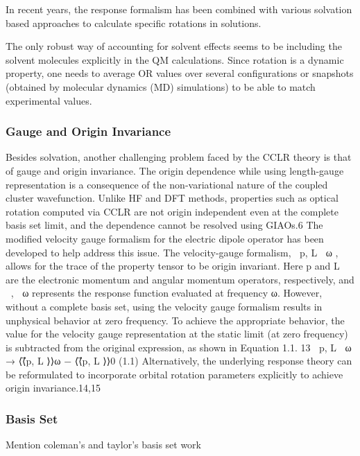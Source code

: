In recent years, the response formalism has been combined with various solvation based
approaches\cite{Neugebauer05,Neugebauer09,Mennucci02,Tomasi05,JensenGordon96}
to calculate specific rotations in solutions. 


The only robust way of accounting for solvent effects seems to be including the solvent molecules explicitly 
in the QM calculations. Since rotation is a dynamic property, one needs to average OR values over several 
configurations or snapshots (obtained by molecular dynamics (MD) simulations) to be able to match experimental 
values. 

\subsubsection{Gauge and Origin Invariance}
Besides solvation, another challenging problem faced by the CCLR theory is that of 
gauge and origin invariance.
The origin dependence while using length-gauge representation is a consequence of the non-variational nature of the 
coupled cluster wavefunction. Unlike HF and DFT methods, properties such as optical rotation computed via CCLR 
are not origin independent even at the complete basis set limit, and the dependence cannot be resolved using GIAOs.6 
The modified velocity gauge formalism for the electric dipole operator has been developed to help address this 
issue. The velocity-gauge formalism, ⟨⟨⃗p, L⃗ ⟩⟩ω , allows for the trace of the property tensor to be origin 
invariant. Here ⃗p and L⃗ are the electronic momentum and angular momentum operators, respectively, and 
⟨⟨, ⟩⟩ω represents the response function evaluated at frequency ω. However, without a complete basis
set, using the velocity gauge formalism results in unphysical behavior at zero frequency. To achieve the 
appropriate behavior, the value for the velocity gauge representation at the static limit (at zero frequency) 
is subtracted from the original expression, as shown in Equation 1.1. 13
⟨⟨⃗p, L⃗ ⟩⟩ω → ⟨⟨⃗p, L⃗ ⟩⟩ω − ⟨⟨⃗p, L⃗ ⟩⟩0 (1.1) Alternatively, the underlying response theory can be reformulated to incorporate 
orbital rotation parameters explicitly to achieve origin invariance.14,15
\subsubsection{Basis Set}
Mention coleman's and taylor's basis set work 
